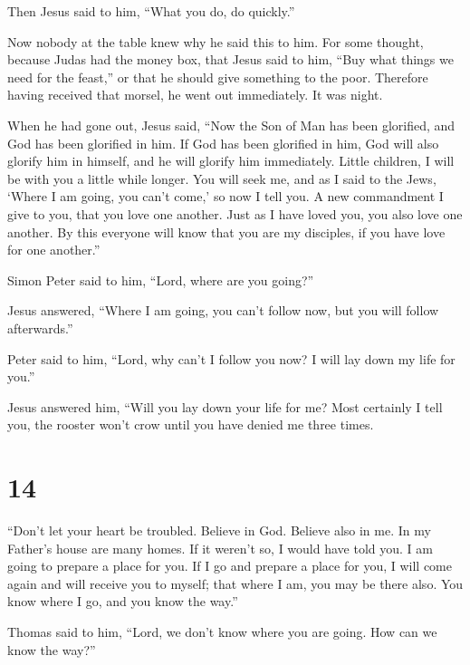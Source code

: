 Then Jesus said to him, ``What you do, do quickly.''

 Now nobody at the table knew why he said this to him.
 For some thought, because Judas had the money box, that
Jesus said to him, ``Buy what things we need for the feast,'' or that he
should give something to the poor.  Therefore having
received that morsel, he went out immediately. It was night.

 When he had gone out, Jesus said, ``Now the Son of Man has
been glorified, and God has been glorified in him.  If God
has been glorified in him, God will also glorify him in himself, and he
will glorify him immediately.  Little children, I will be
with you a little while longer. You will seek me, and as I said to the
Jews, `Where I am going, you can't come,' so now I tell you.
 A new commandment I give to you, that you love one
another. Just as I have loved you, you also love one another.
 By this everyone will know that you are my disciples, if
you have love for one another.''

 Simon Peter said to him, ``Lord, where are you going?''

Jesus answered, ``Where I am going, you can't follow now, but you will
follow afterwards.''

 Peter said to him, ``Lord, why can't I follow you now? I
will lay down my life for you.''

 Jesus answered him, ``Will you lay down your life for me?
Most certainly I tell you, the rooster won't crow until you have denied
me three times.

\hypertarget{section-13}{%
\section{14}\label{section-13}}

 ``Don't let your heart be troubled. Believe in God. Believe
also in me.  In my Father's house are many homes. If it
weren't so, I would have told you. I am going to prepare a place for
you.  If I go and prepare a place for you, I will come again
and will receive you to myself; that where I am, you may be there also.
 You know where I go, and you know the way.''

 Thomas said to him, ``Lord, we don't know where you are
going. How can we know the way?''

